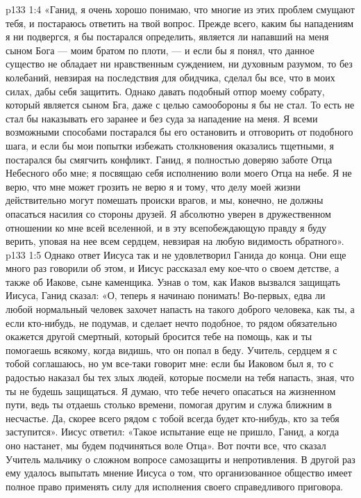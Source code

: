 \vs p133 1:4 «Ганид, я очень хорошо понимаю, что многие из этих проблем смущают тебя, и постараюсь ответить на твой вопрос. Прежде всего, каким бы нападениям я ни подвергся, я бы постарался определить, является ли напавший на меня сыном Бога --- моим братом по плоти, --- и если бы я понял, что данное существо не обладает ни нравственным суждением, ни духовным разумом, то без колебаний, невзирая на последствия для обидчика, сделал бы все, что в моих силах, дабы себя защитить. Однако давать подобный отпор моему собрату, который является сыном Бга, даже с целью самообороны я бы не стал. То есть не стал бы наказывать его заранее и без суда за нападение на меня. Я всеми возможными способами постарался бы его остановить и отговорить от подобного шага, и если бы мои попытки избежать столкновения оказались тщетными, я постарался бы смягчить конфликт. Ганид, я полностью доверяю заботе Отца Небесного обо мне; я посвящаю себя исполнению воли моего Отца на небе. Я не верю, что мне может грозить  не верю я и тому, что делу моей жизни действительно могут помешать происки врагов, и мы, конечно, не должны опасаться насилия со стороны друзей. Я абсолютно уверен в дружественном отношении ко мне всей вселенной, и в эту всепобеждающую правду я буду верить, уповая на нее всем сердцем, невзирая на любую видимость обратного».
\vs p133 1:5 Однако ответ Иисуса так и не удовлетворил Ганида до конца. Они еще много раз говорили об этом, и Иисус рассказал ему кое\hyp{}что о своем детстве, а также об Иакове, сыне каменщика. Узнав о том, как Иаков вызвался защищать Иисуса, Ганид сказал: «О, теперь я начинаю понимать! Во\hyp{}первых, едва ли любой нормальный человек захочет напасть на такого доброго человека, как ты, а если кто\hyp{}нибудь, не подумав, и сделает нечто подобное, то рядом обязательно окажется другой смертный, который бросится тебе на помощь, как и ты помогаешь всякому, когда видишь, что он попал в беду. Учитель, сердцем я с тобой соглашаюсь, но ум все\hyp{}таки говорит мне: если бы Иаковом был я, то с радостью наказал бы тех злых людей, которые посмели на тебя напасть, зная, что ты не будешь защищаться. Я думаю, что тебе нечего опасаться на жизненном пути, ведь ты отдаешь столько времени, помогая другим и служа ближним в несчастье. Да, скорее всего рядом с тобой всегда будет кто\hyp{}нибудь, кто за тебя заступится». Иисус ответил: «Такое испытание еще не пришло, Ганид, а когда оно настанет, мы будем подчиняться воле Отца». Вот почти все, что сказал Учитель мальчику о сложном вопросе самозащиты и непротивления. В другой раз ему удалось выпытать мнение Иисуса о том, что организованное общество имеет полное право применять силу для исполнения своего справедливого приговора.

